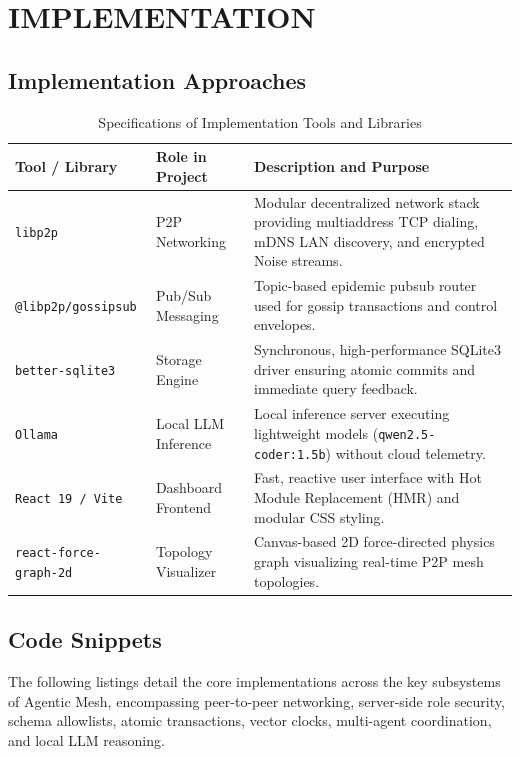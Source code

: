 \documentclass[12pt,a4paper]{report}
\begin{document}
\chapter{IMPLEMENTATION}

\section{Implementation Approaches}
\begin{table}[H]
\centering
\caption{Specifications of Implementation Tools and Libraries}
\label{tab:impl_tools}
\begin{tabularx}{\textwidth}{|l|l|X|}
\hline
\textbf{Tool / Library} & \textbf{Role in Project} & \textbf{Description and Purpose} \\
\hline
\texttt{libp2p} & P2P Networking & Modular decentralized network stack providing multiaddress TCP dialing, mDNS LAN discovery, and encrypted Noise streams. \\
\texttt{@libp2p/gossipsub} & Pub/Sub Messaging & Topic-based epidemic pubsub router used for gossip transactions and control envelopes. \\
\texttt{better-sqlite3} & Storage Engine & Synchronous, high-performance SQLite3 driver ensuring atomic commits and immediate query feedback. \\
\texttt{Ollama} & Local LLM Inference & Local inference server executing lightweight models (\texttt{qwen2.5-coder:1.5b}) without cloud telemetry. \\
\texttt{React 19 / Vite} & Dashboard Frontend & Fast, reactive user interface with Hot Module Replacement (HMR) and modular CSS styling. \\
\texttt{react-force-graph-2d} & Topology Visualizer & Canvas-based 2D force-directed physics graph visualizing real-time P2P mesh topologies. \\
\hline
\end{tabularx}
\end{table}

\section{Code Snippets}
The following listings detail the core implementations across the key subsystems of Agentic Mesh, encompassing peer-to-peer networking, server-side role security, schema allowlists, atomic transactions, vector clocks, multi-agent coordination, and local LLM reasoning.
\end{document}
